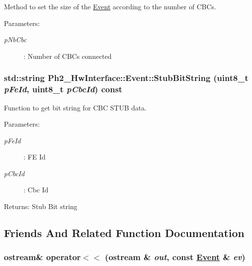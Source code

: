 Method to set the size of the \hyperlink{class_ph2___hw_interface_1_1_event}{Event} according to the number of CBCs. 

\begin{Desc}
\item[Parameters:]
\begin{description}
\item[{\em p\-Nb\-Cbc}]: Number of CBCs connected \end{description}
\end{Desc}
\hypertarget{class_ph2___hw_interface_1_1_event_bc647a9563bd796f8785590a2b5b525b}{
\subsubsection[StubBitString]{\setlength{\rightskip}{0pt plus 5cm}std::string Ph2\_\-Hw\-Interface::Event::Stub\-Bit\-String (uint8\_\-t {\em p\-Fe\-Id}, uint8\_\-t {\em p\-Cbc\-Id}) const}}
\label{class_ph2___hw_interface_1_1_event_bc647a9563bd796f8785590a2b5b525b}


Function to get bit string for CBC STUB data. 

\begin{Desc}
\item[Parameters:]
\begin{description}
\item[{\em p\-Fe\-Id}]: FE Id \item[{\em p\-Cbc\-Id}]: Cbc Id \end{description}
\end{Desc}
\begin{Desc}
\item[Returns:]Stub Bit string \end{Desc}


\subsection{Friends And Related Function Documentation}
\hypertarget{class_ph2___hw_interface_1_1_event_dd2a25ce09465ee24314bbbf409f7ee1}{
\subsubsection[operator$<$$<$]{\setlength{\rightskip}{0pt plus 5cm}ostream\& operator$<$$<$ (ostream \& {\em out}, const \hyperlink{class_ph2___hw_interface_1_1_event}{Event} \& {\em ev})}}
\label{class_ph2___hw_interface_1_1_event_dd2a25ce09465ee24314bbbf409f7ee1}




